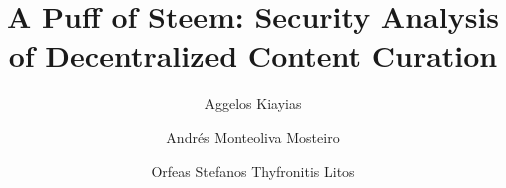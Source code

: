 \title{A Puff of Steem: Security Analysis of Decentralized Content Curation}
\author{Aggelos Kiayias \and Andr\'es Monteoliva Mosteiro \and
Orfeas Stefanos Thyfronitis Litos}
\maketitle
